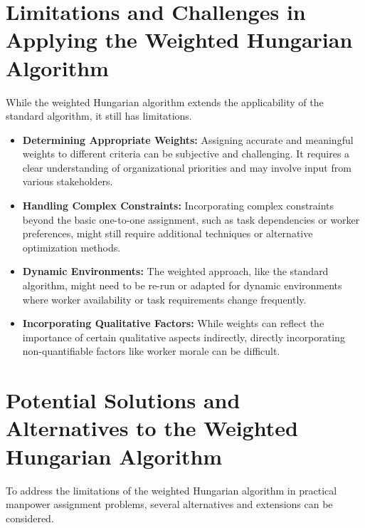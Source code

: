 \documentclass{article}
\begin{document}
\section{Limitations and Challenges in Applying the Weighted Hungarian Algorithm}

While the weighted Hungarian algorithm extends the applicability of the standard algorithm, it still has limitations.

\begin{itemize}
    \item \textbf{Determining Appropriate Weights:} Assigning accurate and meaningful weights to different criteria can be subjective and challenging. It requires a clear understanding of organizational priorities and may involve input from various stakeholders.
    \item \textbf{Handling Complex Constraints:} Incorporating complex constraints beyond the basic one-to-one assignment, such as task dependencies or worker preferences, might still require additional techniques or alternative optimization methods.
    \item \textbf{Dynamic Environments:} The weighted approach, like the standard algorithm, might need to be re-run or adapted for dynamic environments where worker availability or task requirements change frequently.
    \item \textbf{Incorporating Qualitative Factors:} While weights can reflect the importance of certain qualitative aspects indirectly, directly incorporating non-quantifiable factors like worker morale can be difficult.
\end{itemize}

\section{Potential Solutions and Alternatives to the Weighted Hungarian Algorithm}

To address the limitations of the weighted Hungarian algorithm in practical manpower assignment problems, several alternatives and extensions can be considered.
\end{document}
